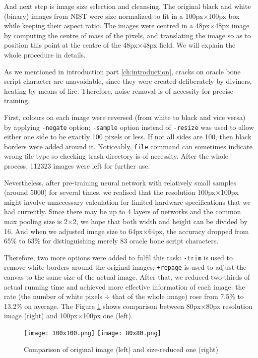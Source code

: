 And next step is image size selection and cleansing. The original black and white (binary) images from NIST were size normalized to fit in a 100px$ \times $100px box while keeping their aspect ratio. The images were centred in a 48px$ \times $48px image by computing the centre of mass of the pixels, and translating the image so as to position this point at the centre of the 48px$ \times $48px field. We will explain the whole procedure in details.

As we mentioned in introduction part \ref{ch:introduction}, cracks on oracle bone script character are unavoidable, since they were created deliberately by diviners, heating by means of fire. Therefore, noise removal is of necessity for precise training.

First, colours on each image were reversed (from white to black and vice versa) by applying \texttt{-negate} option; \texttt{-sample} option instead of \texttt{-resize} was used to allow either one side to be exactly 100 pixels or less. If not all sides are 100, then black borders were added around it. Noticeably, \texttt{file} command can sometimes indicate wrong file type so checking trash directory is of necessity. After the whole process, 112323 images were left for further use.

Nevertheless, after pre-training neural network with relatively small samples (around 5000) for several times, we realised that the resolution 100px$ \times $100px might involve unnecessary calculation for limited hardware specifications that we had currently. Since there may be up to 4 layers of networks and the common max pooling size is 2$ \times $2, we hope that both width and height can be divided by 16. And when we adjusted image size to 64px$ \times $64px, the accuracy dropped from 65\% to 63\% for distinguishing merely 83 oracle bone script characters.

Therefore, two more options were added to fulfil this task: \texttt{-trim} is used to remove white borders around the original images; \texttt{+repage} is used to adjust the canvas to the same size of the actual image. After that, we reduced two-thirds of actual running time and achieved more effective information of each image: the rate (the number of white pixels $ \div $ that of the whole image) rose from 7.5\% to 13.2\% on average. The Figure \ref{fig:comparison} shows comparison between 80px$ \times $80px resolution image (right) and 100px$ \times $100px one (left).
\begin{figure}[h]
	\centering
	\texttt{[image: 100x100.png]}
	\texttt{[image: 80x80.png]} 
	\caption{Comparison of original image (left) and size-reduced one (right)}
	\label{fig:comparison}
\end{figure}

